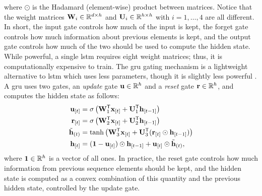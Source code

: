where $\odot$ is the Hadamard (element-wise) product between matrices. Notice that the weight matrices $\Matrix{W}_i \in \Real^{d \times h}$ and $\Matrix{U}_i \in \Real^{h \times h}$ with $i=1, \ldots, 4$ are all different. In short, the input gate controls how much of the input is kept, the forget gate controls how much information about previous elements is kept, and the output gate controls how much of the two should be used to compute the hidden state. While powerful, a single \gls{lstm} requires eight weight matrices; thus, it is computationally expensive to train. The \gls{gru} \citep{cho2014gru} gating mechanism is a lightweight alternative to \gls{lstm} which uses less parameters, though it is slightly less powerful \citep{gruber2020gruspecificlstm}. A \gls{gru} uses two gates, an \emph{update} gate $\Vector{u} \in \Real^h$ and a \emph{reset} gate $\Vector{r} \in \Real^h$, and computes the hidden state as follows:
\begin{align*}
    \Elem{u}{t} &= \sigma\Paren{\Matrix{W}_{1}^{\Transpose}\Elem{x}{t} + \Matrix{U}_{1}^{\Transpose}\Elem{h}{t-1}}\\
    \Elem{r}{t} &= \sigma\Paren{\Matrix{W}_{2}^{\Transpose}\Elem{x}{t} + \Matrix{U}_{2}^{\Transpose}\Elem{h}{t-1}}\\
    \tilde{\Vector{h}}_{(t)} &= \Fun{tanh}\Paren{\Matrix{W}_{3}^{\Transpose}\Elem{x}{t} + \Matrix{U}_{3}^{\Transpose}(\Elem{r}{t} \odot \Elem{h}{t-1})}\\
    \Elem{h}{t} &= (\boldsymbol{1} - \Elem{u}{t}) \odot \Elem{h}{t-1} + \Elem{u}{t} \odot \tilde{\Vector{h}}_{(t)},
\end{align*}
where $\boldsymbol{1} \in \mathbb{R}^h$ is a vector of all ones. In practice, the reset gate controls how much information from previous sequence elements should be kept, and the hidden state is computed as a convex combination of this quantity and the previous hidden state, controlled by the update gate.


